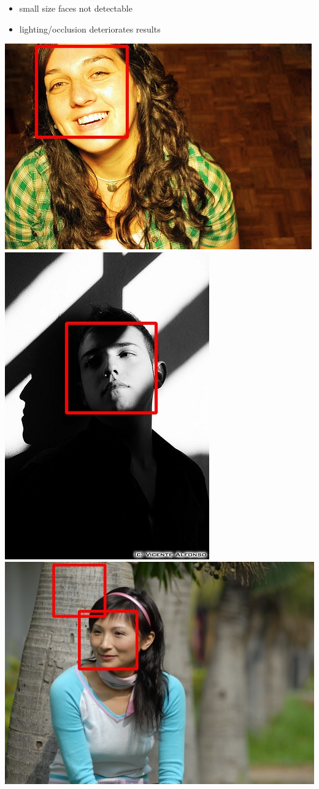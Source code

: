 \begin{xpsectionbox}{}{}
\begin{minipage}{0.5\linewidth}
\begin{itemize}
	  \item small size faces not detectable
	  \item lighting/occlusion deteriorates results 
\end{itemize}
\begin{center}
			\includegraphics[height=0.2\linewidth]{images/image00613}
			\includegraphics[height=0.2\linewidth]{images/image00571}
			\includegraphics[height=0.2\linewidth]{images/image00210}
\end{center}

\end{minipage}
\begin{minipage}{0.5\linewidth}

\vspace{-2.5cm}
{\vspace*{0.2cm}\noindent\hspace*{0.2cm}{\bf\Titlesize Improvements}\newline}{\vspace{-0.75cm}}


\end{minipage}
\end{xpsectionbox}
